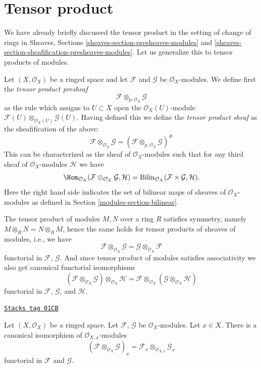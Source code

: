 \section{Tensor product}
\label{modules-section-tensor-product}
We have already briefly discussed the tensor product in the setting
of change of rings in Sheaves, Sections
\ref{sheaves-section-presheaves-modules} and
\ref{sheaves-section-sheafification-presheaves-modules}.
Let us generalize this to tensor products of modules.

\medskip\noindent
Let $(X, \mathcal{O}_X)$ be a ringed space and let
$\mathcal{F}$ and $\mathcal{G}$ be $\mathcal{O}_X$-modules.
We define first the {\it tensor product presheaf}
$$
\mathcal{F} \otimes_{p, \mathcal{O}_X} \mathcal{G}
$$
as the rule which assigns to $U \subset X$ open the
$\mathcal{O}_X(U)$-module
$\mathcal{F}(U) \otimes_{\mathcal{O}_X(U)} \mathcal{G}(U)$.
Having defined this we define the {\it tensor product sheaf}
as the sheafification of the above:
$$
\mathcal{F} \otimes_{\mathcal{O}_X} \mathcal{G}
=
(\mathcal{F} \otimes_{p, \mathcal{O}_X} \mathcal{G})^\#
$$
This can be characterized as the sheaf of
$\mathcal{O}_X$-modules such that for any third
sheaf of $\mathcal{O}_X$-modules $\mathcal{H}$
we have
$$
\Hom_{\mathcal{O}_X}
(\mathcal{F} \otimes_{\mathcal{O}_X} \mathcal{G}, \mathcal{H})
=
\text{Bilin}_{\mathcal{O}_X}(\mathcal{F} \times \mathcal{G}, \mathcal{H}).
$$
Here the right hand side indicates the set of bilinear maps of sheaves
of $\mathcal{O}_X$-modules as defined in Section \ref{modules-section-bilinear}.

\medskip\noindent
The tensor product of modules $M, N$ over a ring $R$ satisfies symmetry,
namely $M \otimes_R N = N \otimes_R M$, hence the same holds for
tensor products of sheaves of modules, i.e., we have
$$
\mathcal{F} \otimes_{\mathcal{O}_X} \mathcal{G}
=
\mathcal{G} \otimes_{\mathcal{O}_X} \mathcal{F}
$$
functorial in $\mathcal{F}$, $\mathcal{G}$.
And since tensor product of modules satisfies associativity we
also get canonical functorial isomorphisms
$$
(\mathcal{F} \otimes_{\mathcal{O}_X} \mathcal{G})
\otimes_{\mathcal{O}_X} \mathcal{H}
=
\mathcal{F} \otimes_{\mathcal{O}_X}
(\mathcal{G} \otimes_{\mathcal{O}_X} \mathcal{H})
$$
functorial in $\mathcal{F}$, $\mathcal{G}$, and $\mathcal{H}$.

\begin{lemma}
\label{modules-lemma-stalk-tensor-product}
\href{https://stacks.math.columbia.edu/tag/01CB}{\texttt{Stacks tag 01CB}}

Let $(X, \mathcal{O}_X)$ be a ringed space.
Let $\mathcal{F}$, $\mathcal{G}$ be $\mathcal{O}_X$-modules.
Let $x \in X$. There is a canonical isomorphism
of $\mathcal{O}_{X, x}$-modules
$$
(\mathcal{F} \otimes_{\mathcal{O}_X} \mathcal{G})_x
=
\mathcal{F}_x \otimes_{\mathcal{O}_{X, x}} \mathcal{G}_x
$$
functorial in $\mathcal{F}$ and $\mathcal{G}$.
\end{lemma}

